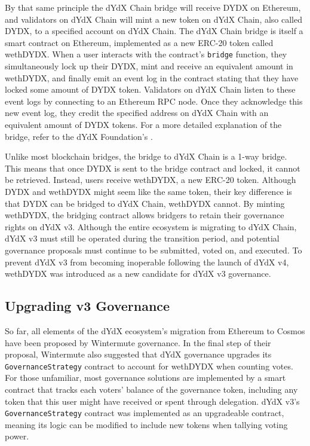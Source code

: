         By that same principle the dYdX Chain bridge will receive DYDX on Ethereum, and validators on dYdX Chain will mint a new token on dYdX Chain, also called DYDX, to a specified account on dYdX Chain. The dYdX Chain bridge is itself a smart contract on Ethereum, implemented as a new ERC-20 token called wethDYDX. When a user interacts with the contract's \texttt{bridge} function, they simultaneously lock up their DYDX, mint and receive an equivalent amount in wethDYDX, and finally emit an event log in the contract stating that they have locked some amount of DYDX token. Validators on dYdX Chain listen to these event logs by connecting to an Ethereum RPC node. Once they acknowledge this new event log, they credit the specified address on dYdX Chain with an equivalent amount of DYDX tokens. For a more detailed explanation of the bridge, refer to the dYdX Foundation's .

        Unlike most blockchain bridges, the bridge to dYdX Chain is a 1-way bridge. This means that once DYDX is sent to the bridge contract and locked, it cannot be retrieved. Instead, users receive wethDYDX, a new ERC-20 token. Although DYDX and wethDYDX might seem like the same token, their key difference is that DYDX can be bridged to dYdX Chain, wethDYDX cannot. By minting wethDYDX, the bridging contract allows bridgers to retain their governance rights on dYdX v3. Although the entire ecosystem is migrating to dYdX Chain, dYdX v3 must still be operated during the transition period, and potential governance proposals must continue to be submitted, voted on, and executed. To prevent dYdX v3 from becoming inoperable following the launch of dYdX v4, wethDYDX was introduced as a new candidate for dYdX v3 governance.

    \subsection{Upgrading v3 Governance}

        So far, all elements of the dYdX ecosystem's migration from Ethereum to Cosmos have been proposed by Wintermute governance. In the final step of their proposal, Wintermute also suggested that dYdX governance upgrades its \texttt{GovernanceStrategy} contract to account for wethDYDX when counting votes. For those unfamiliar, most governance solutions are implemented by a smart contract that tracks each voters' balance of the governance token, including any token that this user might have received or spent through delegation. dYdX v3's \texttt{GovernanceStrategy} contract was implemented as an upgradeable contract, meaning its logic can be modified to include new tokens when tallying voting power.

